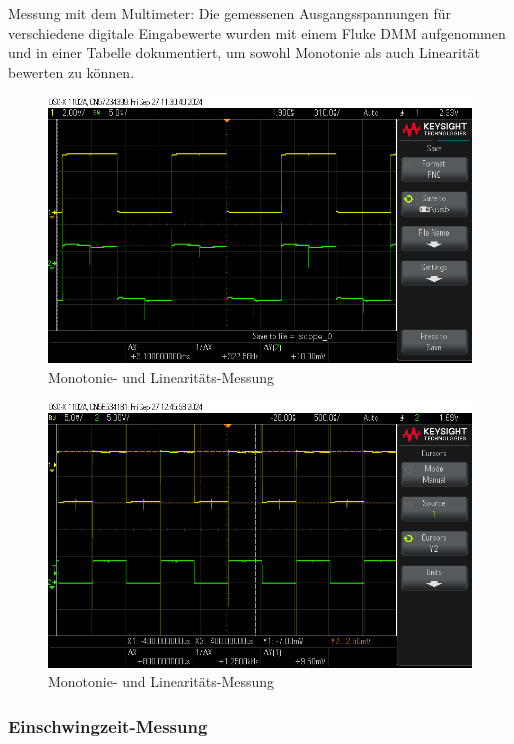 \documentclass[a4paper,12pt]{article}
\begin{document}
\noindent Messung mit dem Multimeter: Die gemessenen Ausgangsspannungen für verschiedene digitale Eingabewerte wurden mit einem Fluke DMM aufgenommen und in einer Tabelle dokumentiert, um sowohl Monotonie als auch Linearität bewerten zu können.

\begin{figure}[H]
    \centering
    \includegraphics[width=1\textwidth]{../Quellen/Labor1/Versuch2/scope_0.png}
    \caption{Monotonie- und Linearitäts-Messung}
\end{figure}

\begin{figure}[H]
    \centering
    \includegraphics[width=1\textwidth]{../Quellen/Labor1/Versuch2/scope_2.png}
    \caption{Monotonie- und Linearitäts-Messung}
\end{figure}

\subsubsection {Einschwingzeit-Messung}
\end{document}
